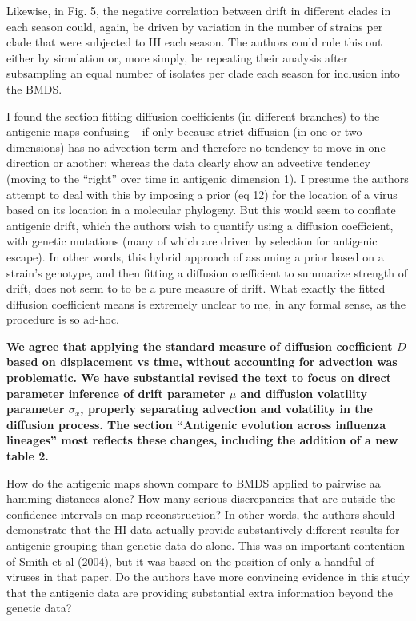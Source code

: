 \documentclass[11pt,oneside,letterpaper]{article}
\newcommand{\virussd}{\sigma_x}						%
\newcommand{\drift}{\mu}							%
\begin{document}
Likewise, in Fig. 5, the negative correlation between drift in different clades in each season could, again, be driven by variation in the number of strains per clade that were subjected to HI each season. The authors could rule this out either by simulation or, more simply, be repeating their analysis after subsampling an equal number of isolates per clade each season for inclusion into the BMDS.

I found the section fitting diffusion coefficients (in different branches) to the antigenic maps confusing -- if only because strict diffusion (in one or two dimensions) has no advection term and therefore no tendency to move in one direction or another; whereas the data clearly show an advective tendency (moving to the ``right'' over time in antigenic dimension 1). I presume the authors attempt to deal with this by imposing a prior (eq 12) for the location of a virus based on its location in a molecular phylogeny. But this would seem to conflate antigenic drift, which the authors wish to quantify using a diffusion coefficient, with genetic mutations (many of which are driven by selection for antigenic escape). In other words, this hybrid approach of assuming a prior based on a strain's genotype, and then fitting a diffusion coefficient to summarize strength of drift, does not seem to to be a pure measure of drift. What exactly the fitted diffusion coefficient means is extremely unclear to me, in any formal sense, as the procedure is so ad-hoc.

\textbf{We agree that applying the standard measure of diffusion coefficient $D$ based on displacement vs time, without accounting for advection was problematic.  We have substantial revised the text to focus on direct parameter inference of drift parameter $\drift$ and diffusion volatility parameter $\virussd$, properly separating advection and volatility in the diffusion process.  The section ``Antigenic evolution across influenza lineages'' most reflects these changes, including the addition of a new table 2.}

How do the antigenic maps shown compare to BMDS applied to pairwise aa hamming distances alone? How many serious discrepancies that are outside the confidence intervals on map reconstruction? In other words, the authors should demonstrate that the HI data actually provide substantively different results for antigenic grouping than genetic data do alone. This was an important contention of Smith et al (2004), but it was based on the position of only a handful of viruses in that paper. Do the authors have more convincing evidence in this study that the antigenic data are providing substantial extra information beyond the genetic data?
\end{document}
